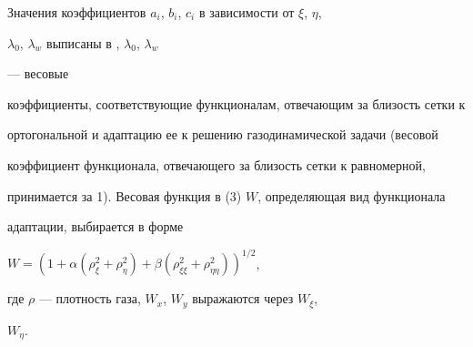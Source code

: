 Значения коэффициентов $a_i$, $b_i$, $c_i$ в зависимости от $\xi$, $\eta$, 


$\lambda_0$, $\lambda_w$ выписаны в \cite{Bra}, $\lambda_0$, $\lambda_w$ 


--- весовые 


коэффициенты, соответствующие функционалам, отвечающим за близость сетки к 


ортогональной и адаптацию ее к решению газодинамической задачи (весовой 


коэффициент функционала, отвечающего за близость сетки к равномерной,


принимается за 1). Весовая функция в (3) $W$, определяющая вид функционала 


адаптации, выбирается в форме 


$W=(1+\alpha(\rho^2_\xi+\rho^2_\eta)+\beta(\rho^2_{\xi\xi}+ 


\rho^2_{\eta\eta}))^{1/2}$, 


где $\rho$ --- плотность газа, $W_x$, $W_y$ выражаются через $W_\xi$, 


$W_\eta$. 


 



